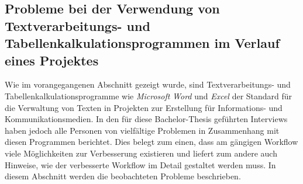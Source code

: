 \subsection{Probleme bei der Verwendung von Textverarbeitungs- und Tabellenkalkulationsprogrammen im Verlauf eines Projektes}
\label{l:officeprobleme}

Wie im vorangegangenen Abschnitt gezeigt wurde, sind Textverarbeitungs- und Tabellenkalkulationsprogramme wie \emph{Microsoft} \emph{Word} und \emph{Excel} der Standard für die Verwaltung von Texten in Projekten zur Erstellung für Informations- und Kommunikationsmedien. In den für diese Bachelor-Thesis geführten Interviews haben jedoch alle Personen von vielfältige Problemen in Zusammenhang mit diesen Programmen berichtet. Dies belegt zum einen, dass am gängigen Workflow viele Möglichkeiten zur Verbesserung existieren und liefert zum andere auch Hinweise, wie der verbesserte Workflow im Detail gestaltet werden muss. In diesem Abschnitt werden die beobachteten Probleme beschrieben.

